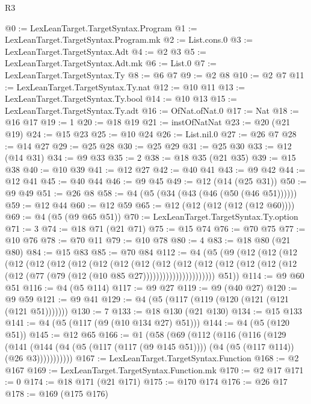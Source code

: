 \begin{lexlean}{R3}
\begin{coremodule}
@0 := LexLeanTarget.TargetSyntax.Program
@1 := LexLeanTarget.TargetSyntax.Program.mk
@2 := List.cons.{0}
@3 := LexLeanTarget.TargetSyntax.Adt
@4 := @2 @3
@5 := LexLeanTarget.TargetSyntax.Adt.mk
@6 := List.{0}
@7 := LexLeanTarget.TargetSyntax.Ty
@8 := @6 @7
@9 := @2 @8
@10 := @2 @7
@11 := LexLeanTarget.TargetSyntax.Ty.nat
@12 := @10 @11
@13 := LexLeanTarget.TargetSyntax.Ty.bool
@14 := @10 @13
@15 := LexLeanTarget.TargetSyntax.Ty.adt
@16 := OfNat.ofNat.{0}
@17 := Nat
@18 := @16 @17
@19 := 1
@20 := @18 @19
@21 := instOfNatNat
@23 := @20 (@21 @19)
@24 := @15 @23
@25 := @10 @24
@26 := List.nil.{0}
@27 := @26 @7
@28 := @14 @27
@29 := @25 @28
@30 := @25 @29
@31 := @25 @30
@33 := @12 (@14 @31)
@34 := @9 @33
@35 := 2
@38 := @18 @35 (@21 @35)
@39 := @15 @38
@40 := @10 @39
@41 := @12 @27
@42 := @40 @41
@43 := @9 @42
@44 := @12 @41
@45 := @40 @44
@46 := @9 @45
@49 := @12 (@14 (@25 @31))
@50 := @9 @49
@51 := @26 @8
@58 := @4 (@5 (@34 (@43 (@46 (@50 (@46 @51))))))
@59 := @12 @44
@60 := @12 @59
@65 := @12 (@12 (@12 (@12 (@12 @60))))
@69 := @4 (@5 (@9 @65 @51))
@70 := LexLeanTarget.TargetSyntax.Ty.option
@71 := 3
@74 := @18 @71 (@21 @71)
@75 := @15 @74
@76 := @70 @75
@77 := @10 @76
@78 := @70 @11
@79 := @10 @78
@80 := 4
@83 := @18 @80 (@21 @80)
@84 := @15 @83
@85 := @70 @84
@112 := @4
    (@5
      (@9
        (@12
          (@12
            (@12
              (@12
                (@12
                  (@12
                    (@12
                      (@12
                        (@12
                          (@12
                            (@12
                              (@12
                                (@12
                                  (@12
                                    (@12
                                      (@12
                                        (@12 (@12 (@77 (@79 (@12 (@10 @85 @27))))))))))))))))))))))
        @51))
@114 := @9 @60 @51
@116 := @4 (@5 @114)
@117 := @9 @27
@119 := @9 (@40 @27)
@120 := @9 @59
@121 := @9 @41
@129 := @4 (@5 (@117 (@119 (@120 (@121 (@121 (@121 @51)))))))
@130 := 7
@133 := @18 @130 (@21 @130)
@134 := @15 @133
@141 := @4 (@5 (@117 (@9 (@10 @134 @27) @51)))
@144 := @4 (@5 (@120 @51))
@145 := @12 @65
@166 := @1
    (@58
      (@69
        (@112
          (@116
            (@116
              (@129
                (@141
                  (@144 (@4 (@5 (@117 (@117 (@9 @145 @51)))) (@4 (@5 (@117 @114)) (@26 @3)))))))))))
@167 := LexLeanTarget.TargetSyntax.Function
@168 := @2 @167
@169 := LexLeanTarget.TargetSyntax.Function.mk
@170 := @2 @17
@171 := 0
@174 := @18 @171 (@21 @171)
@175 := @170 @174
@176 := @26 @17
@178 := @169 (@175 @176)

\end{coremodule}
\end{lexlean}
